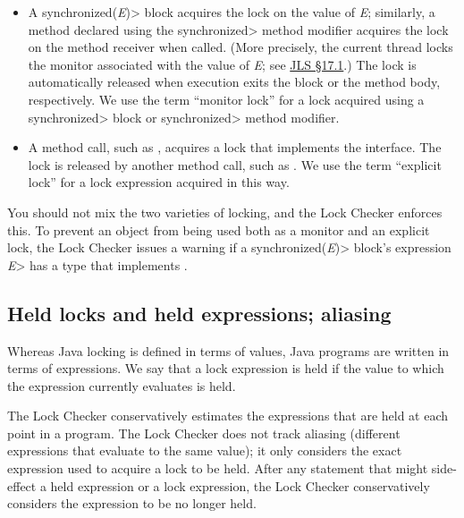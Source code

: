 \begin{itemize}
\item
  A \<synchronized(\emph{E})> block acquires the lock on the value of
  \emph{E}; similarly, a method declared using the \<synchronized> method
  modifier acquires the lock on the method receiver when called.
  (More precisely,
  the current thread locks the monitor associated with the value of
  \emph{E}; see \href{https://docs.oracle.com/javase/specs/jls/se8/html/jls-17.html#jls-17.1}{JLS \S17.1}.)
  The lock is automatically released when execution exits the block or the
  method body, respectively.
  We use the term ``monitor lock'' for a lock acquired using a
  \<synchronized>  block or \<synchronized> method modifier.
\item A method call, such as
  ,
  acquires a lock that implements the
  interface.
  The lock is released by another method call, such as
  .
  We use the term ``explicit lock'' for a lock expression acquired in this
  way.
\end{itemize}

You should not mix the two varieties of locking, and the Lock Checker
enforces this.  To prevent an object from being used both as a monitor and
an explicit lock, the Lock Checker issues a warning if a
\<synchronized(\emph{E})> block's expression \<\emph{E}> has a type that
implements .


\subsection{Held locks and held expressions; aliasing\label{lock-aliasing}}

Whereas Java locking is defined in terms of values, Java programs are
written in terms of expressions.
We say that a lock expression is held if the value to which the expression
currently evaluates is held.

The Lock Checker conservatively estimates the expressions that are held at
each point in a program.
The Lock Checker does not track aliasing
(different expressions that evaluate to the same value); it only considers
the exact expression used to acquire a lock to be held.  After any statement
that might side-effect a held expression or a lock expression, the Lock
Checker conservatively considers the expression to be no longer held.

